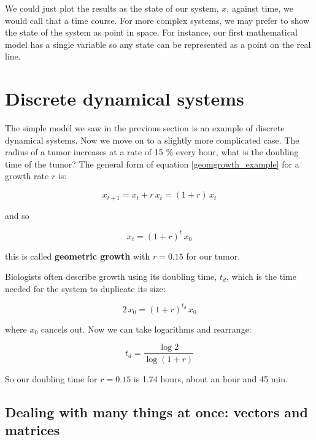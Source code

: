 \documentclass[12pt]{article}
\begin{document}
 We could just plot the results as the state of our system, $x$, against time, we would call that a time course. For more complex systems, we may prefer to show the state of the system as point in space. For instance, our first mathematical model has a single variable so any  state can be represented as a point on the real line.

\section{Discrete dynamical systems}

The simple model we saw in the previous section is an example of discrete dynamical systems. Now we move on to a slightly more complicated case. The radius of a tumor increases at a rate of  15 \% every hour, what is the doubling time of the tumor? The general form of equation \ref{geomgrowth_example} for a growth rate $r$ is:

\begin{equation}
\label{geomgrowth_general}
x_{t+1} = x_t  + r \, x_t =(1 + r) \, x_t
\end{equation}

and so

\begin{equation}
\label{geomgrowth_general2}
x_{t} = (1 + r)^{t} \, x_0
\end{equation}


this is called \textbf{geometric growth} with $r=0.15$ for our tumor. 



Biologists often describe growth using its doubling time, $t_d$,  which is the time needed for the system to duplicate its size:

\begin{equation}
2\, x_{0} = (1 + r)^{t_d} \, x_0
\end{equation}

where $x_0$ cancels out. Now we can take  logarithms and rearrange:

\begin{equation}
t_d = \frac{\log 2}{\log (1 + r) }
\end{equation}

So our doubling time for $r=0.15$ is 1.74 hours, about an hour and 45 min.

\subsection{Dealing with many things at once: vectors and matrices}
\end{document}
